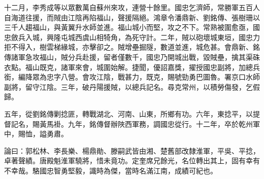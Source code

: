 \begin{pinyinscope}
十二月，李秀成等以眾數萬自蘇州來攻，連營十餘里。國忠乞濟師，常勝軍五百人自海道往援，而賊由江陰再陷福山，聲援隔絕。鴻章令潘鼎新、劉銘傳、張樹珊以三千人趨福山，與黃翼升水師並進。福山城小而堅，攻之不下。常熟被圍愈亟，國忠斂兵入城，興隆屯城西虞山相犄角，為死守計。二年，賊以砲壞城東垣，國忠力拒不得入，樹雲梯緣城，亦擊卻之。賊增壘掘隧，數道並進，城危甚。會鼎新、銘傳諸軍急攻福山，賊分兵赴援，留者僅數千，國忠乃開城出戰，毀賊壘，擒其渠硃衣點。福山既克，諸軍來會，城圍始解。捷聞，優詔嘉獎，擢授國忠副將，加總兵銜，編降眾為忠字八營。會攻江陰，戰甚力，既克，賜號勁勇巴圖魯。署京口水師副將，留守江陰。三年，破丹陽援賊，以總兵記名。尋克常州，以積勞傷發，乞假歸。

五年，從劉銘傳剿捻匪，轉戰湖北、河南、山東，所鄉有功。六年，東捻平，以提督記名，賜黃馬褂。九年，銘傳督辦陜西軍務，調國忠從行。十二年，卒於乾州軍中，賜恤，謚勇肅。

論曰：郭松林、李長樂、楊鼎勛、滕嗣武皆由湘、楚舊部改隸淮軍，平吳、平捻，卓著聲績。唐殿魁淮軍驍將，惜未竟功。定奎席兄餘光，名位轉出其上，固有幸有不幸哉。駱國忠智勇堅毅，識時為傑，當時名滿江南，成績可紀也。


\end{pinyinscope}